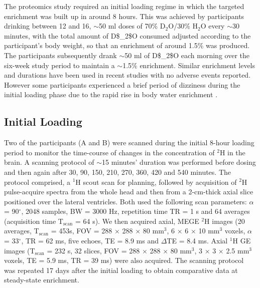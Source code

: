 The proteomics study required an initial loading regime in which the targeted enrichment was built up in around 8 hours. This was achieved by participants drinking between 12 and 16, $\sim$50 ml doses of 70\% D$_2$O/30\% H$_2$O every $\sim$30 minutes, with the total amount of \ac{D$_2$O} consumed adjusted according to the participant’s body weight, so that an enrichment of around 1.5\% was produced. The participants subsequently drank $\sim$50 ml of \ac{D$_2$O} each morning over the six-week study period to maintain a $\sim$1.5\% enrichment. Similar enrichment levels and durations have been used in recent studies \cite{Robinson2011Long-termSupplementation, Burger2017LeukemiaIbrutinib, Loomba2019DiscoveryLabeling} with no adverse events reported. However some participants experienced a brief period of dizziness during the initial loading phase due to the rapid rise in body water enrichment \cite{Robinson2011Long-termSupplementation}. 


\subsection{Initial Loading}

Two of the participants (A and B) were scanned during the initial 8-hour loading period to monitor the time-course of changes in the concentration of $^2$H in the brain. A scanning protocol of $\sim$15 minutes’ duration was performed before dosing and then again after 30, 90, 150, 210, 270, 360, 420 and 540 minutes. The protocol comprised, a $^1$H scout scan for planning, followed by acquisition of $^2$H pulse-acquire spectra from the whole head and then from a 2-cm-thick axial slice positioned over the lateral ventricles. Both used the following scan parameters: $\alpha$ = 90$^\circ$, 2048 samples, \ac{BW} = 3000 Hz, repetition time TR = 1 s and 64 averages (acquisition time T$_\text{scan}$ = 64 s). We then acquired axial, \ac{MEGE} $^2$H images (20 averages, T$_\text{scan}$ = 453s, \ac{FOV} = 288 $\times$ 288 $\times$ 80 mm$^3$, 6 $\times$ 6 $\times$ 10 mm$^3$ voxels, $\alpha$ = 33$^\circ$, \ac{TR} = 62 ms, five echoes, \ac{TE} = 8.9 ms and $\Delta$\ac{TE} = 8.4 ms. Axial $^1$H \ac{GE} images (T$_\text{scan}$ = 232 s, 32 slices, \ac{FOV} = 288 $\times$ 288 $\times$ 80 mm$^3$, 3 $\times$ 3 $\times$ 2.5 mm$^3$ voxels, \ac{TE} = 5.9 ms, \ac{TR} = 39 ms) were also acquired. The scanning protocol was repeated 17 days after the initial loading to obtain comparative data at steady-state enrichment. 

